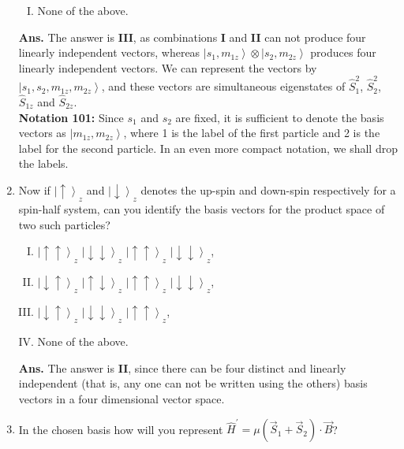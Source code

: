 \documentclass[12pt]{article}
\begin{document}
\begin{enumerate}[1.]
\begin{enumerate}[I.]
              \item None of the above. \newline
       \end{enumerate}  
\textbf{Ans.} The answer is \textbf{III}, as combinations \textbf{I} and \textbf{II} can not produce four linearly independent vectors, whereas $\left | s_1, m_{1z} \right \rangle \otimes \left | s_2, m_{2z} \right \rangle$ produces four linearly independent vectors. We can represent the vectors by $\left | s_1, s_2, m_{1z}, m_{2z} \right \rangle$, and these vectors are simultaneous eigenstates of $\hat{S}_1^2$, $\hat{S}_2^2$, $\hat{S}_{1z}$ and $\hat{S}_{2z}$. \\ \newline
\textbf{Notation 101:} Since $s_1$ and $s_2$ are fixed, it is sufficient to denote the basis vectors as $\left | m_{1z}, m_{2z} \right \rangle $, where 1 is the label of the first particle and 2 is the label for the second particle. In an even more compact notation, we shall drop the labels. \\ \newline
\item Now if $\left | \uparrow \right \rangle _z$ and $\left | \downarrow \right \rangle _z$ denotes the up-spin and down-spin respectively for a spin-half system, can you identify the basis vectors for the product space of two such particles?
       \begin{enumerate}[I.]
              \item $\left | \uparrow \uparrow \right \rangle _z$ $\left | \downarrow \downarrow \right \rangle _z$ $\left | \uparrow \uparrow \right \rangle _z$ $\left | \downarrow \downarrow \right \rangle _z$,
              \item $\left | \downarrow \uparrow \right \rangle _z$ $\left | \uparrow \downarrow \right \rangle _z$ $\left | \uparrow \uparrow \right \rangle _z$ $\left | \downarrow \downarrow \right \rangle _z$,
              \item $\left | \downarrow \uparrow \right \rangle _z$ $\left | \downarrow \downarrow \right \rangle _z$ $\left | \uparrow \uparrow \right \rangle _z$,
              \item None of the above.
       \end{enumerate}
\newpage
\textbf{Ans.} The answer is \textbf{II}, since there can be four distinct and linearly independent (that is, any one can not be written using the others) basis vectors in a four dimensional vector space.
\item In the chosen basis how will you represent $\hat{H}^{'}=\mu \left(\vec{S}_1 + \vec{S}_2 \right)\cdot \vec{B}$? \newline

\end{enumerate}
\end{document}
